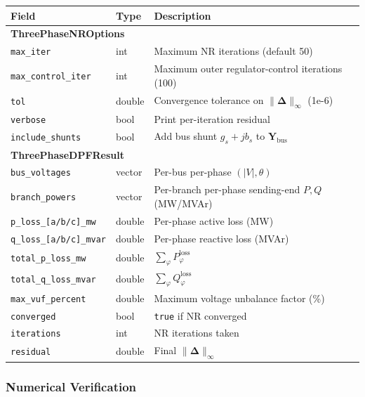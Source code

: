 \begin{center}
\small
\begin{tabular}{lll}
\hline\hline
Field & Type & Description \\
\hline
\multicolumn{3}{l}{\textbf{ThreePhaseNROptions}} \\
\texttt{max\_iter}         & int    & Maximum NR iterations (default 50) \\
\texttt{max\_control\_iter}& int    & Maximum outer regulator-control iterations (100) \\
\texttt{tol}               & double & Convergence tolerance on
                                       $\|\boldsymbol{\Delta}\|_\infty$ (1e-6) \\
\texttt{verbose}           & bool   & Print per-iteration residual \\
\texttt{include\_shunts}   & bool   & Add bus shunt $g_s + jb_s$ to $\mathbf{Y}_{\text{bus}}$ \\
\hline
\multicolumn{3}{l}{\textbf{ThreePhaseDPFResult}} \\
\texttt{bus\_voltages}     & vector & Per-bus per-phase $(|V|, \theta)$ \\
\texttt{branch\_powers}    & vector & Per-branch per-phase sending-end $P, Q$ (MW/MVAr) \\
\texttt{p\_loss\_[a/b/c]\_mw}   & double & Per-phase active loss (MW) \\
\texttt{q\_loss\_[a/b/c]\_mvar} & double & Per-phase reactive loss (MVAr) \\
\texttt{total\_p\_loss\_mw}     & double & $\sum_\varphi P^\text{loss}_\varphi$ \\
\texttt{total\_q\_loss\_mvar}   & double & $\sum_\varphi Q^\text{loss}_\varphi$ \\
\texttt{max\_vuf\_percent}      & double & Maximum voltage unbalance factor (\%) \\
\texttt{converged}         & bool   & \texttt{true} if NR converged \\
\texttt{iterations}        & int    & NR iterations taken \\
\texttt{residual}          & double & Final $\|\boldsymbol{\Delta}\|_\infty$ \\
\hline\hline
\end{tabular}
\end{center}

\subsubsection{Numerical Verification}
\label{sec:3ph-nr-results}

